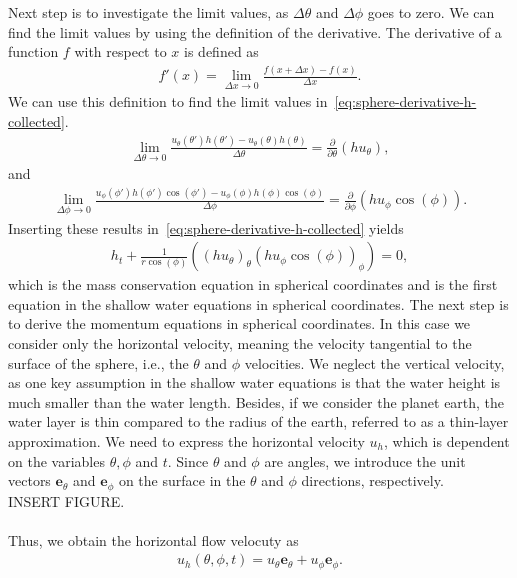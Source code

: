Next step is to investigate the limit values, as $\Delta \theta$ and $\Delta \phi$ goes to zero.
We can find the limit values by using the definition of the derivative.
The derivative of a function $f$ with respect to $x$ is defined as
\begin{align*}
    f'(x) = \lim_{\Delta x \to 0} \frac{f(x + \Delta x) - f(x)}{\Delta x}.
\end{align*}
We can use this definition to find the limit values in~\eqref{eq:sphere-derivative-h-collected}.
\begin{align*}
    \lim_{\Delta \theta \to 0} \frac{ u_\theta(\theta ')h(\theta ') - u_\theta(\theta) h(\theta) }{\Delta \theta} = \frac{\partial}{\partial \theta} (h u_\theta ),
\end{align*}
and 
\begin{align*}
    \lim_{\Delta \phi \to 0} \frac{ u_\phi(\phi ')h(\phi ') \cos(\phi') - u_\phi(\phi) h(\phi) \cos(\phi) }{\Delta \phi} =  \frac{\partial}{\partial \phi} (h u_\phi \cos(\phi)).
\end{align*}
Inserting these results in~\eqref{eq:sphere-derivative-h-collected} yields
\begin{align*}
    h_t + \frac{1}{r \cos (\phi)} \left( {(h u_\theta)}_{\theta} {(h u_{\phi} \cos(\phi))}_{\phi}  \right) = 0,
\end{align*}
which is the mass conservation equation in spherical coordinates and is the first equation in the shallow water equations in spherical coordinates.
The next step is to derive the momentum equations in spherical coordinates.
In this case we consider only the horizontal velocity, meaning the velocity tangential to the surface of the sphere, i.e., the $\theta$ and $\phi$ velocities.
We neglect the vertical velocity, as one key assumption in the shallow water equations is that the water height is much smaller than the water length.
Besides, if we consider the planet earth, the water layer is thin compared to the radius of the earth, referred to as a thin-layer approximation.
We need to express the horizontal velocity $u_h$, which is dependent on the variables $\theta, \phi$ and $t$.
Since $\theta$ and $\phi$ are angles, we introduce the unit vectors $\mathbf{e}_\theta$ and $\mathbf{e}_\phi$ on the surface in the $\theta$ and $\phi$ directions, respectively.
\\
INSERT FIGURE.\\
\\
Thus, we obtain the horizontal flow velocuty as
\begin{align}\label{eq:sphere-horizontal-velocity}
    u_h(\theta, \phi, t) = u_\theta \mathbf{e}_\theta + u_\phi \mathbf{e}_\phi.
\end{align}
